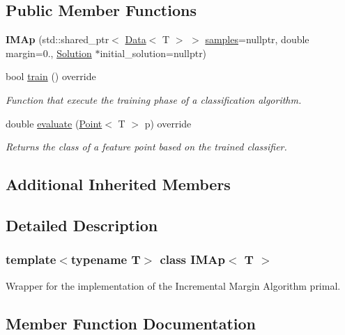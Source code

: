 \subsection*{Public Member Functions}
\begin{DoxyCompactItemize}
\item 
\mbox{\label{class_i_m_ap_a54d31e0bcbb062d224a40fdb3a9fcdcd}} 
{\bfseries I\+M\+Ap} (std\+::shared\+\_\+ptr$<$ \hyperlink{class_data}{Data}$<$ T $>$ $>$ \hyperlink{class_classifier_a0000b47a2e0784ada4c52d7046c4adb8}{samples}=nullptr, double margin=0., \hyperlink{class_solution}{Solution} $\ast$initial\+\_\+solution=nullptr)
\item 
bool \hyperlink{class_i_m_ap_aa8bf6b0d21a76d388fe81ee516b627e4}{train} () override
\begin{DoxyCompactList}\small\item\em Function that execute the training phase of a classification algorithm. \end{DoxyCompactList}\item 
double \hyperlink{class_i_m_ap_a41b0739cdc486e3f21e7927f1ad429a8}{evaluate} (\hyperlink{class_point}{Point}$<$ T $>$ p) override
\begin{DoxyCompactList}\small\item\em Returns the class of a feature point based on the trained classifier. \end{DoxyCompactList}\end{DoxyCompactItemize}
\subsection*{Additional Inherited Members}


\subsection{Detailed Description}
\subsubsection*{template$<$typename T$>$\newline
class I\+M\+Ap$<$ T $>$}

Wrapper for the implementation of the Incremental Margin Algorithm primal. 

\subsection{Member Function Documentation}
\mbox{\label{class_i_m_ap_a41b0739cdc486e3f21e7927f1ad429a8}} 
